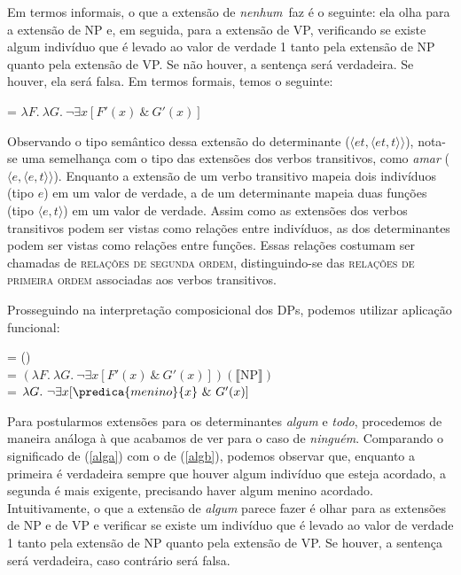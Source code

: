 \n Em termos informais, o que a extensão de \textit{nenhum}\ faz é o
seguinte: ela olha para a extensão de NP e, em seguida, para a extensão de VP, verificando se existe algum indivíduo que é levado ao valor de
verdade 1 tanto pela extensão de NP quanto pela extensão de VP. Se
não houver, a sentença será verdadeira. Se houver, ela será falsa.
Em termos formais, temos o seguinte:

\begin{exe}
	\ex {} = $\lambda F.\ \lambda G.\ \neg\exists x [F'(x)\ \& \ G'(x)]$
\end{exe}

\n Observando o tipo semântico dessa extensão do determinante ($\langle et,\langle et,t\rangle\rangle$), nota-se uma semelhança com o tipo das extensões dos verbos transitivos, como \textit{amar} ($\langle e,\langle e,t\rangle\rangle$). Enquanto a extensão de um verbo transitivo mapeia dois indivíduos (tipo $e$) em um valor de verdade, a de um determinante mapeia duas funções (tipo $\langle e,t\rangle$) em um valor de verdade. Assim como as extensões dos verbos transitivos podem ser vistas como relações entre indivíduos, as dos determinantes podem ser vistas como relações entre funções. Essas relações costumam ser chamadas de \textsc{relações de segunda ordem}, distinguindo-se das \textsc{relações de primeira ordem} associadas aos verbos transitivos.

Prosseguindo na interpretação composicional dos DPs, podemos utilizar aplicação funcional:

\begin{exe}
	\ex {} = ()\\
	= $(\lambda F.\ \lambda G.\ \neg\exists x [F'(x)\ \& \ G'(x)])(\llbracket \text{NP} \rrbracket)$\\
	= $\lambda G.\ \neg \exists x [ \predica{menino}{x}\ \& \ G'(x)]$
\end{exe}

Para postularmos extensões para os determinantes \textit{algum} e \textit{todo},
procedemos de maneira análoga à que acabamos de ver para o caso de
\textit{ninguém}. Comparando o significado de (\ref{alga}) com o de
(\ref{algb}), podemos observar que, enquanto a primeira é
verdadeira sempre que houver algum indivíduo que esteja acordado,
a segunda é mais exigente, precisando haver algum menino acordado.
Intuitivamente, o que a extensão de \textit{algum} parece fazer é olhar
para as extensões de NP e de VP e verificar se existe um indivíduo
que é levado ao valor de verdade 1 tanto pela extensão de NP
quanto pela extensão de VP. Se houver, a sentença será verdadeira,
caso contrário será falsa.

